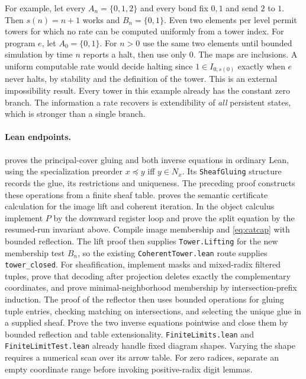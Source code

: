 For example, let every $A_n=\{0,1,2\}$ and every bond fix $0,1$ and
send $2$ to $1$. Then $s(n)=n+1$ works and $B_n=\{0,1\}$.
Even two elements per level permit towers for which no rate can be computed uniformly from a tower index.
For program $e$, let $A_0=\{0,1\}$. For $n>0$ use the same two elements
until bounded simulation by time $n$ reports a halt, then use only $0$.
The maps are inclusions. A uniform computable rate would decide halting since $1\in I_{0,s(0)}$ exactly when $e$ never halts, by stability and the
definition of the tower. This is an external impossibility result.
Every tower in this example already has the constant zero branch. The
information a rate recovers is extendibility of \emph{all} persistent
states, which is stronger than a single branch.

\paragraph{Lean endpoints.}
 proves the principal-cover gluing and both inverse equations in ordinary Lean, using the specialization preorder $x\preceq y$ iff $y\in N_x$. Its \texttt{SheafGluing} structure records the glue, its restrictions and uniqueness. The preceding proof constructs these operations from a finite sheaf table.  proves the semantic certificate calculation
for the image lift and coherent iteration. In the object calculus implement
$P$ by the downward register loop and prove the split equation by the
resumed-run invariant above. Compile image membership and
\eqref{eq:catcap} with bounded reflection. The lift proof then supplies
\texttt{Tower.Lifting} for the new membership test $B_n$, so the existing
\texttt{CoherentTower.lean} route supplies \texttt{tower\_closed}.
For sheafification, implement masks and mixed-radix filtered tuples, prove
that decoding after projection deletes exactly the complementary coordinates,
and prove minimal-neighborhood membership by intersection-prefix induction.
The proof of the reflector then uses bounded operations for gluing tuple
entries, checking matching on intersections, and selecting the unique glue
in a supplied sheaf. Prove the two inverse equations pointwise and close
them by bounded reflection and table extensionality.
\texttt{FiniteLimits.lean} and \texttt{FiniteLimitTest.lean} already handle
fixed diagram shapes. Varying the shape requires a numerical scan over
its arrow table. For zero radices, separate an empty coordinate range
before invoking positive-radix digit lemmas.
